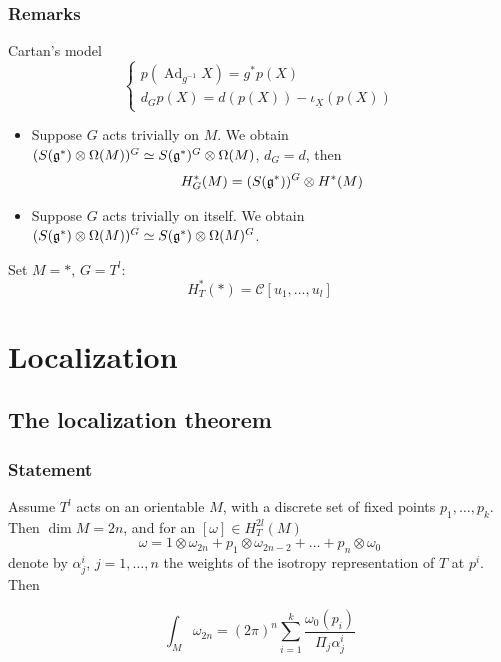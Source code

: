 \documentclass{beamer}
\DeclareMathOperator{\Ad}{Ad}
\begin{document}

\begin{frame}
\frametitle{Remarks}
\begin{block}{Cartan's model}
\[\begin{cases}
p(\Ad_{g^{-1}}X)=g^*p(X)\\
d_Gp(X)=d(p(X))-\iota_{\underline X}(p(X))
\end{cases}\]
\end{block}
\begin{itemize}
\item Suppose $G$ acts trivially on $M$. We obtain $(S(\frak g^*)\otimes \Omega(M))^G\simeq S(\frak g^*)^G\otimes \Omega(M)$, $d_G=d$, then
\[
H^*_G(M)=(S(\frak g^*))^G\otimes H^*(M)
\]
\item Suppose $G$ acts trivially on itself. We obtain $(S(\frak g^*)\otimes \Omega(M))^G\simeq S(\frak g^*)\otimes \Omega(M)^G$.
\end{itemize}
Set $M=*$, $G=T^l$:
\[
H^*_T(*)=\mathcal C[u_1,\dots,u_l]
\]
\end{frame}


\section{Localization}
\subsection{The localization theorem}
\begin{frame}
\frametitle{Statement}
Assume $T^l$ acts on an orientable $M$, with a discrete set of fixed points $p_1,\dots,p_k$. Then $\dim M=2n$, and for an $[\omega]\in H^{2l}_T(M)$
\[
\omega=1\otimes \omega_{2n}+p_1\otimes \omega_{2n-2}+\dots+p_{n}\otimes \omega_0
\]
denote by $\alpha^i_j$, $j=1,\dots,n$ the weights of the isotropy representation of $T$ at $p^i$. Then
\begin{theorem}
\[
\int_M\omega_{2n}=(2\pi)^n\sum_{i=1}^k\frac{\omega_0(p_i)}{\Pi_{j}\alpha^i_j}
\]
\end{theorem}

\end{frame}

\end{document}
